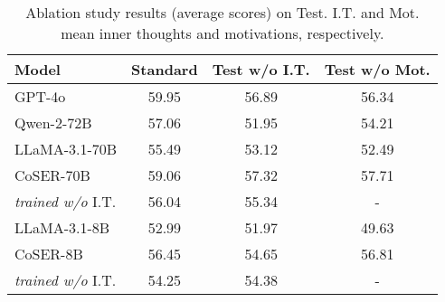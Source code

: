 \begin{table}[t]
\centering
\setlength{\tabcolsep}{3pt}
\renewcommand{\arraystretch}{0.9}
\begin{tabular}{lccc}%
\toprule
\multirow{1}{*}{\textbf{Model}} & \multicolumn{1}{c}{\textbf{Standard}} & \multicolumn{1}{c}{\textbf{Test w/o I.T.}} & \multicolumn{1}{c}{\textbf{Test w/o Mot.}} \\
\midrule
GPT-4o & 59.95 & 56.89 & 56.34 \\
Qwen-2-72B & 57.06 & 51.95 & 54.21 \\
LLaMA-3.1-70B & 55.49 & 53.12 & 52.49 \\
CoSER-70B & 59.06 & 57.32 & 57.71 \\
\hfill\hfill\hfill {\textit{trained w/o} \textsc{I.T.}} & 56.04 & 55.34 & - \\
LLaMA-3.1-8B & 52.99 & 51.97 & 49.63 \\
CoSER-8B & 56.45 & 54.65 & 56.81 \\
\hfill\hfill\hfill {\textit{trained w/o} \textsc{I.T.}} & 54.25 & 54.38 & - \\
\bottomrule
\end{tabular}
\caption{
Ablation study results (average scores) on \method Test. 
I.T. and Mot. mean inner thoughts and motivations, respectively. }
\label{tab:model-comparison-inner-thought}
\end{table}
